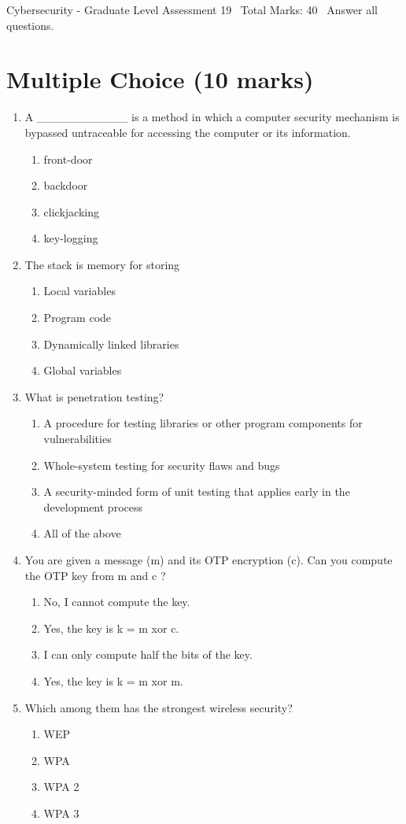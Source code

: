 \documentclass[12pt]{article}
\begin{document}
\begin{center}
Cybersecurity - Graduate Level Assessment 19 \
Total Marks: 40 \
Answer all questions.
\end{center}

\section*{Multiple Choice (10 marks)}
\begin{enumerate}[label=\arabic*.]
\item A \_\_\_\_\_\_\_\_\_\_\_ is a method in which a computer security mechanism is bypassed untraceable for accessing the computer or its information.
\begin{enumerate}[label=(\alph*)]
    \item front-door
    \item backdoor
    \item clickjacking
    \item key-logging
\end{enumerate}
\item The stack is memory for storing
\begin{enumerate}[label=(\alph*)]
    \item Local variables
    \item Program code
    \item Dynamically linked libraries
    \item Global variables
\end{enumerate}
\item What is penetration testing?
\begin{enumerate}[label=(\alph*)]
    \item A procedure for testing libraries or other program components for vulnerabilities
    \item Whole-system testing for security flaws and bugs
    \item A security-minded form of unit testing that applies early in the development process
    \item All of the above
\end{enumerate}
\item You are given a message (m) and its OTP encryption (c). Can you compute the OTP key from m and c ?
\begin{enumerate}[label=(\alph*)]
    \item No, I cannot compute the key.
    \item Yes, the key is k = m xor c.
    \item I can only compute half the bits of the key.
    \item Yes, the key is k = m xor m.
\end{enumerate}
\item Which among them has the strongest wireless security?
\begin{enumerate}[label=(\alph*)]
    \item WEP
    \item WPA
    \item WPA 2
    \item WPA 3
\end{enumerate}
\end{enumerate}
\end{document}
